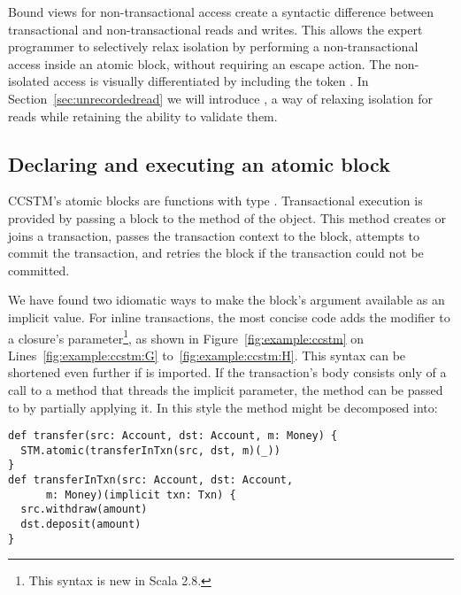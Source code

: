 Bound views for non-transactional access create a syntactic difference
between transactional and non-transactional reads and writes.
This allows the expert programmer to selectively relax isolation by
performing a non-transactional access inside an atomic block, without
requiring an escape action.  The non-isolated access
is visually differentiated by including the token .  In
Section~\ref{sec:unrecordedread} we will introduce ,
a way of relaxing isolation for reads while retaining the ability to
validate them.

\subsection{Declaring and executing an atomic block}

CCSTM's atomic blocks are functions with type
\code{(}\code{ => }\code{)}.
Transactional execution is provided by passing a block to the
 method of the  object.  This method creates or
joins a transaction, passes the transaction context to the block, attempts
to commit the transaction, and retries the block if the transaction could not
be committed.

We have found two idiomatic ways to make the block's  argument available as
an implicit value.  For inline transactions, the most concise code adds the
 modifier to a closure's parameter\footnote{This syntax is new in
Scala 2.8.}, as shown in Figure~\ref{fig:example:ccstm}
on Lines~\ref{fig:example:ccstm:G} to~\ref{fig:example:ccstm:H}.  This syntax
can be shortened even further if  is imported.
If the transaction's body consists only of a call to a method that threads the
implicit  parameter, the method can be passed to  by
partially applying it.  In this style the  method
might be decomposed into:
\lstset{numbers=none}
\lstset{xleftmargin=0.125in}
\begin{lstlisting}
def transfer(src: Account, dst: Account, m: Money) {
  STM.atomic(transferInTxn(src, dst, m)(_))
}
def transferInTxn(src: Account, dst: Account,
      m: Money)(implicit txn: Txn) {
  src.withdraw(amount)
  dst.deposit(amount)
}
\end{lstlisting}
\lstset{numbers=left}
\lstset{xleftmargin=0.25in}

